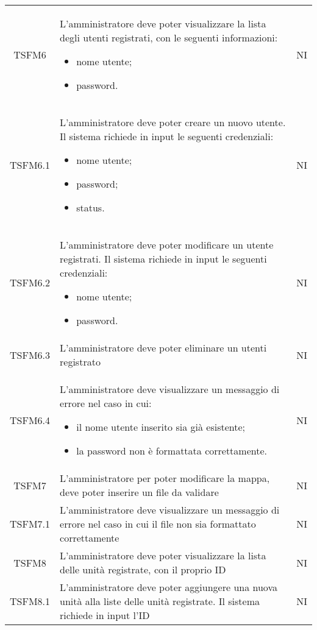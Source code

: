\begin{longtable}[h!] { c  m{12cm} c}
		TSFM6 & L'amministratore deve poter visualizzare la lista degli utenti registrati, con le seguenti informazioni:
					\begin{itemize}
						\item nome utente;
						\item password.
					\end{itemize}
									& NI \\
		TSFM6.1 & L'amministratore deve poter creare un nuovo utente. Il sistema richiede in input le seguenti credenziali:
					\begin{itemize}
						\item nome utente;
						\item password;
						\item status.
					\end{itemize}
										& NI \\

		TSFM6.2  & L'amministratore deve poter modificare un utente registrati. Il sistema richiede in input le seguenti credenziali:
					\begin{itemize}
						\item nome utente;
						\item password.
					\end{itemize}
											& NI \\
		TSFM6.3 & L'amministratore deve poter eliminare un utenti registrato & NI \\

		TSFM6.4 & L'amministratore deve visualizzare un messaggio di errore nel caso in cui:
						\begin{itemize}
						\item il nome utente inserito sia già esistente;
						\item la password non è formattata correttamente.
					\end{itemize}
										& NI \\
		TSFM7   & L'amministratore per poter modificare la mappa, deve poter inserire un file da validare & NI\\

		TSFM7.1 & L'amministratore deve visualizzare un messaggio di errore nel caso in cui il file non sia formattato correttamente & NI \\

		TSFM8   & L'amministratore deve poter visualizzare la lista delle unità registrate, con il proprio ID & NI\\

		TSFM8.1 & L'amministratore deve poter aggiungere una nuova unità alla liste delle unità registrate. Il sistema richiede in input l'ID & NI\\


\end{longtable}

